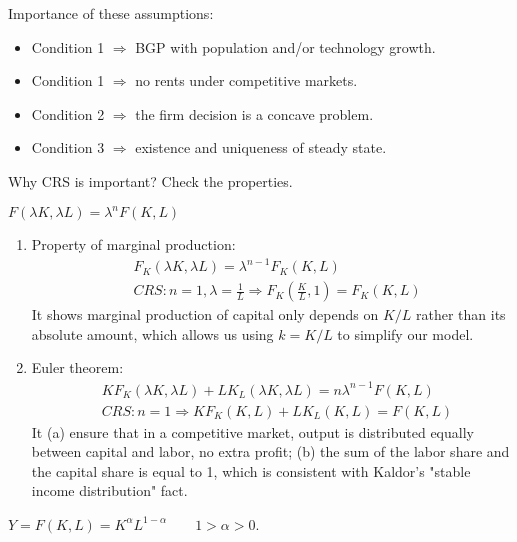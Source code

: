 \begin{remark*} Importance of these assumptions:
    \begin{itemize}
        \item Condition 1 $\Longrightarrow$ BGP with population and/or technology growth.
        \item Condition 1 $\Longrightarrow$ no rents under competitive markets.
        \item Condition 2 $\Longrightarrow$ the firm decision is a concave problem.
        \item Condition 3 $\Longrightarrow$ existence and uniqueness of steady state.
    \end{itemize}

    Why CRS is important? Check the properties.

    $F(\lambda K, \lambda L) = \lambda^{n}F(K,L)$

    \begin{enumerate}
        \item Property of marginal production: \begin{align*}
                   & F_K(\lambda K, \lambda L) = \lambda^{n-1}F_K(K,L)                                \\
                   & CRS: n = 1, \lambda = \frac{1}{L} \Longrightarrow F_K(\frac{K}{L}, 1) = F_K(K,L)
              \end{align*}
              It shows marginal production of capital only depends on $K/L$ rather than its absolute amount, which allows us using $k= K/L$ to simplify our model.
        \item Euler theorem: \begin{align*}
                   & KF_K(\lambda K, \lambda L) + LK_L(\lambda K, \lambda L) = n \lambda ^{n-1}F(K,L) \\
                   & CRS: n = 1 \Longrightarrow KF_K(K,L)+ LK_L(K,L) = F(K,L)
              \end{align*}
              It (a) ensure that in a competitive market, output is distributed equally between capital and labor, no extra profit; (b) the sum of the labor share and the capital share is equal to 1, which is consistent with Kaldor's "stable income distribution" fact.
    \end{enumerate}
\end{remark*}

\begin{example}
    $Y=F(K,L)=K^{\alpha}L^{1-\alpha} \qquad 1 > \alpha > 0$.
\end{example}

